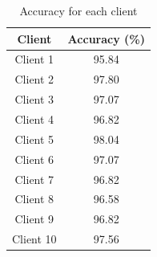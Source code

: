 \documentclass[10pt]{article}
\begin{document}
\begin{table}[H]
\centering
\begin{tabular}{|c|c|}
\hline
\textbf{Client} & \textbf{Accuracy (\%)} \\
\hline
Client 1 & 95.84 \\
Client 2 & 97.80 \\
Client 3 & 97.07 \\
Client 4 & 96.82 \\
Client 5 & 98.04 \\
Client 6 & 97.07 \\
Client 7 & 96.82 \\
Client 8 & 96.58 \\
Client 9 & 96.82 \\
Client 10 & 97.56 \\
\hline
\end{tabular}
\caption{Accuracy for each client}
\label{tab:client_accuracy}
\end{table}


\nocite{*}

\clearpage
 
 
\end{document}

